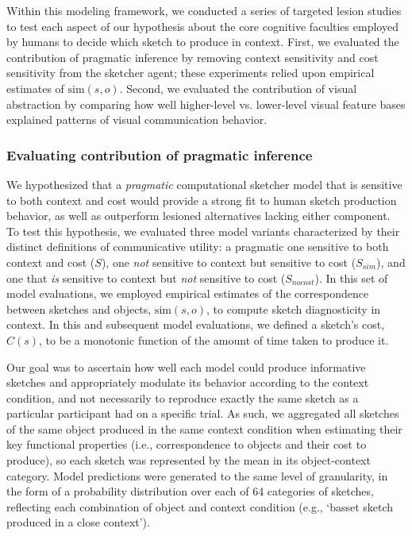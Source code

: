 \documentclass[9pt,twocolumn,twoside]{pnas-new}
\begin{document}
Within this modeling framework, we conducted a series of targeted lesion studies to test each aspect of our hypothesis about the core cognitive faculties employed by humans to decide which sketch to produce in context. 
First, we evaluated the contribution of pragmatic inference by removing context sensitivity and cost sensitivity from the sketcher agent; these experiments relied upon empirical estimates of $\textrm{sim}(s,o)$. 
Second, we evaluated the contribution of visual abstraction by comparing how well higher-level vs. lower-level visual feature bases explained patterns of visual communication behavior.

\subsubsection*{Evaluating contribution of pragmatic inference}


We hypothesized that a \textit{pragmatic} computational sketcher model that is sensitive to both context and cost would provide a strong fit to human sketch production behavior, as well as outperform lesioned alternatives lacking either component.
To test this hypothesis, we evaluated three model variants characterized by their distinct definitions of communicative utility: a pragmatic one sensitive to both context and cost ($S$), one \textit{not} sensitive to context but sensitive to cost ($S_{sim}$), and one that \textit{is} sensitive to context but \textit{not} sensitive to cost ($S_{nocost}$).
In this set of model evaluations, we employed empirical estimates of the correspondence between sketches and objects, $\textrm{sim}(s,o)$, to compute sketch diagnosticity in context. 
In this and subsequent model evaluations, we defined a sketch's cost, $C(s)$, to be a monotonic function of the amount of time taken to produce it.

Our goal was to ascertain how well each model could produce informative sketches and appropriately modulate its behavior according to the context condition, and not necessarily to reproduce exactly the same sketch as a particular participant had on a specific trial. 
As such, we aggregated all sketches of the same object produced in the same context condition when estimating their key functional properties (i.e., correspondence to objects and their cost to produce), so each sketch was represented by the mean in its object-context category. 
Model predictions were generated to the same level of granularity, in the form of a probability distribution over each of 64 categories of sketches, reflecting each combination of object and context condition (e.g., `basset sketch produced in a close context'). 
\end{document}
